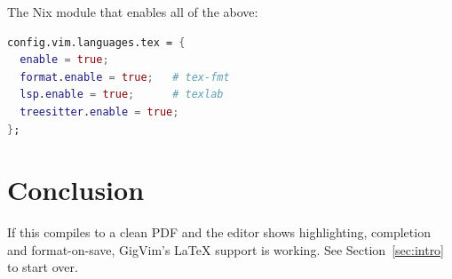 \documentclass[11pt,a4paper]{article}
\begin{document}
The Nix module that enables all of the above:

\begin{lstlisting}[language=Nix]
config.vim.languages.tex = {
  enable = true;
  format.enable = true;   # tex-fmt
  lsp.enable = true;      # texlab
  treesitter.enable = true;
};
\end{lstlisting}

\section{Conclusion}
\label{sec:conclusion}

If this compiles to a clean PDF and the editor shows highlighting, completion
and format-on-save, GigVim's LaTeX support is working. See
Section~\ref{sec:intro} to start over.
\end{document}
